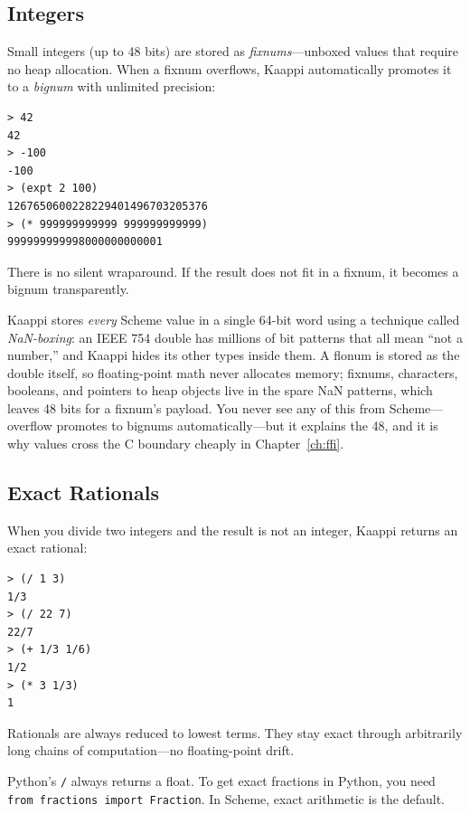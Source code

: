 \subsection{Integers}

Small integers (up to 48 bits) are stored as \emph{fixnums}---unboxed values that require no heap allocation. When a fixnum overflows, Kaappi automatically promotes it to a \emph{bignum} with unlimited precision:

\begin{lstlisting}[style=repl]
> 42
42
> -100
-100
> (expt 2 100)
1267650600228229401496703205376
> (* 999999999999 999999999999)
999999999998000000000001
\end{lstlisting}

There is no silent wraparound. If the result does not fit in a fixnum, it becomes a bignum transparently.

\begin{note}
Kaappi stores \emph{every} Scheme value in a single 64-bit word using a technique called \emph{NaN-boxing}: an IEEE 754 double has millions of bit patterns that all mean ``not a number,'' and Kaappi hides its other types inside them. A flonum is stored as the double itself, so floating-point math never allocates memory; fixnums, characters, booleans, and pointers to heap objects live in the spare NaN patterns, which leaves 48 bits for a fixnum's payload. You never see any of this from Scheme---overflow promotes to bignums automatically---but it explains the 48, and it is why values cross the C boundary cheaply in Chapter~\ref{ch:ffi}.
\end{note}

\subsection{Exact Rationals}

When you divide two integers and the result is not an integer, Kaappi returns an exact rational:

\begin{lstlisting}[style=repl]
> (/ 1 3)
1/3
> (/ 22 7)
22/7
> (+ 1/3 1/6)
1/2
> (* 3 1/3)
1
\end{lstlisting}

Rationals are always reduced to lowest terms. They stay exact through arbitrarily long chains of computation---no floating-point drift.

\begin{note}
Python's \texttt{/} always returns a float. To get exact fractions in Python, you need \texttt{from fractions import Fraction}. In Scheme, exact arithmetic is the default.
\end{note}

